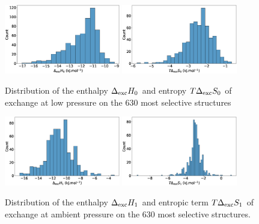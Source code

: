 \documentclass[main.tex]{subfiles}
\begin{document}
  \begin{figure}[h]
    \centering
      \includegraphics[width=0.45\textwidth]{figures/2-thermo/Delta_H_0.jpg}
      \includegraphics[width=0.45\textwidth]{figures/2-thermo/T_Delta_S_0.jpg}
      \caption{Distribution of the enthalpy $\Delta_{\text{exc}}H_{\text{0}}$ and entropy $T\Delta_{\text{exc}}S_{\text{0}}$ of exchange at low pressure on the 630 most selective structures}
      \label{fgr:SI:dist0}
    \end{figure}

    \begin{figure}[h]
      \centering
        \includegraphics[width=0.45\textwidth]{figures/2-thermo/Delta_H_2080.jpg}
        \includegraphics[width=0.45\textwidth]{figures/2-thermo/T_Delta_S_2080.jpg}
        \caption{Distribution of the enthalpy $\Delta_{\text{exc}}H_{\text{1}}$ and entropic term $T\Delta_{\text{exc}}S_{\text{1}}$ of exchange at ambient pressure on the 630 most selective structures.}
        \label{fgr:SI:dist1}
      \end{figure}
\end{document}
